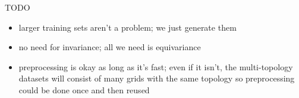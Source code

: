 TODO

\begin{itemize}
    \item larger training sets aren't a problem; we just generate them
    \item no need for invariance; all we need is equivariance
    \item preprocessing is okay as long as it's fast; even if it isn't, the multi-topology datasets
    will consist of many grids with the same topology so preprocessing could be done once and then reused
\end{itemize}